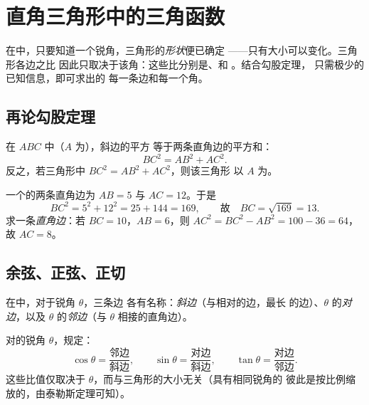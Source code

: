 \chapter{直角三角形中的三角函数}\label{ch:g9:trig}

在中，只要知道一个锐角，三角形的\emph{形状}便已确定
——只有大小可以变化。三角形各边之比
因此只取决于该角：这些比分别是、和
。结合勾股定理，
只需极少的已知信息，即可求出的
每一条边和每一个角。

\section{再论勾股定理}

\begin{theorem}[毕达哥拉斯]\label{thm:g9:trig:pythagoras}
在 $ABC$ 中（$A$ 为），斜边的平方
等于两条直角边的平方和：
\[
BC^2 = AB^2 + AC^2 .
\]
反之，若三角形中 $BC^2 = AB^2 + AC^2$，则该三角形
以 $A$ 为。
\end{theorem}
\admitted

\begin{example}\label{ex:g9:trig:pythagoras}
一个的两条直角边为 $AB = 5$ 与 $AC = 12$。于是
\[
BC^2 = 5^2 + 12^2 = 25 + 144 = 169,
\qquad\text{故}\quad BC = \sqrt{169} = 13 .
\]
求一条\emph{直角边}：若 $BC = 10$，$AB = 6$，则
$AC^2 = BC^2 - AB^2 = 100 - 36 = 64$，故 $AC = 8$。
\end{example}

\section{余弦、正弦、正切}

在中，对于锐角 $\theta$，三条边
各有名称：\emph{斜边}（与相对的边，最长
的边）、$\theta$ 的\emph{对边}，以及
$\theta$ 的\emph{邻边}（与 $\theta$ 相接的直角边）。

\begin{definition}[锐角三角函数]\label{def:g9:trig:ratios}
对的锐角 $\theta$，规定：
\[
\cos\theta = \frac{\text{邻边}}{\text{斜边}},
\qquad
\sin\theta = \frac{\text{对边}}{\text{斜边}},
\qquad
\tan\theta = \frac{\text{对边}}{\text{邻边}} .
\]
这些比值仅取决于
$\theta$，而与三角形的大小无关（具有相同锐角的
彼此是按比例缩放的，由泰勒斯定理可知）。
\end{definition}


